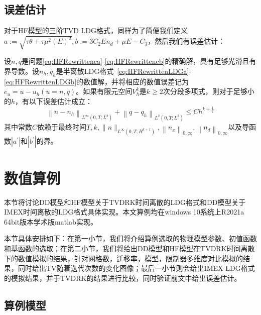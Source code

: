 \subsection{误差估计}
对于HF模型的三阶TVD LDG格式，同样为了简便我们定义$a:=\sqrt{\tau \theta+\tau \mu^{2}\left(E\right)^{2}}, b:=3 C_{2} E n_{d}+\mu E-C_{3}$，然后我们有误差估计\cite{liu2010error}：
\begin{theorem}
    设$n, q$是问题\eqref{eq:HFRewrittenca}-\eqref{eq:HFRewrittencb}的精确解，具有足够光滑且有界导数。设$n_h, q_h$是半离散LDG格式~\eqref{eq:HFRewrittenLDGa}-\eqref{eq:HFRewrittenLDGb}的数值解，并将相应的数值误差记为$e_{u}=u-u_{h}(u=n, q)$。如果有限元空间$V_{h}^{k}$是$k \geq 2$次分段多项式，则对于足够小的$h$，有以下误差估计成立：
    $$
        \left\|n-n_h\right\|_{L^{\infty}\left(0, T ; L^{2}\right)}+\left\|q-q_h\right\|_{L^{2}\left(0, T ; L^{2}\right)} \leq C h^{k+\frac{1}{2}}
    $$
    其中常数$C$依赖于最终时间$T, k, \|n\|_{L^{\infty}\left(0, T ; H^{k+1}\right)}, \left\|n_{x}\right\|_{0, \infty}, \left\|n_{d}\right\|_{0, \infty}$以及导函数$\left|a^{\prime}\right|$和$\left|b^{\prime}\right|$的界。
\end{theorem}
\section{数值算例}
本节将讨论DD模型和HF模型关于TVDRK时间离散的LDG格式和DD模型关于IMEX时间离散的LDG格式具体实现。本文算例均在windows 10系统上R2021a 64bit版本学术版matlab实现。

本节具体安排如下：在第一小节，我们将介绍算例选取的物理模型参数、初值函数和基函数的选取；在第二小节，我们将给出DD模型和HF模型在TVDRK时间离散下的数值模拟的结果，针对网格数，迁移率，模型，限制器多维度对比模拟的结果，同时给出TV随着迭代次数的变化图像；最后一小节则会给出IMEX LDG格式的模拟结果，并于TVDRK的结果进行比较，同时验证前文中给出误差估计。
\subsection{算例模型}
